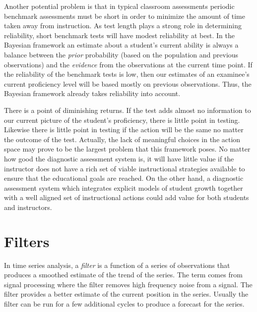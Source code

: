 \documentclass[12pt]{RR-article}
\begin{document}
Another potential problem is that in typical classroom assessments
periodic benchmark assessments must be short in order to minimize the
amount of time taken away from instruction.  As test length plays a
strong role in determining reliability, short benchmark tests will
have modest reliability at best.  In the Bayesian framework an
estimate about a student's current ability is always a balance between
the \textit{prior} probability (based on the population and previous
observations) and the {\it evidence} from the observations at the
current time point.  If the reliability of the benchmark tests is low,
then our estimates of an examinee's current proficiency level will be
based mostly on previous observations.  Thus, the Bayesian
framework already takes reliability into account.

There is a point of diminishing returns.  If the test adds almost no
information to our current picture of the student's proficiency, there
is little point in testing.  Likewise there is little point in testing
if the action will be the same no matter the outcome of the test.
Actually, the lack of meaningful choices in the action space may prove
to be the largest problem that this framework poses.  No matter how
good the diagnostic assessment system is, it will have little value if
the instructor does not have a rich set of viable instructional
strategies available to ensure that the educational goals are reached.
On the other hand, a diagnostic assessment system which integrates
explicit models of student growth together with a well aligned set of
instructional actions could add value for both students and instructors.





\appendix
\section{Filters}
\label{appx:filter}

In time series analysis, a \textit{filter} is a function of a series
of observations that produces a smoothed estimate of the trend of the
series.  The term comes from signal processing where the filter
removes high frequency noise from a signal.  The filter provides a better estimate of the
current position in the series.  Usually the filter can be run for a
few additional cycles to produce a forecast for the series.
\end{document}
